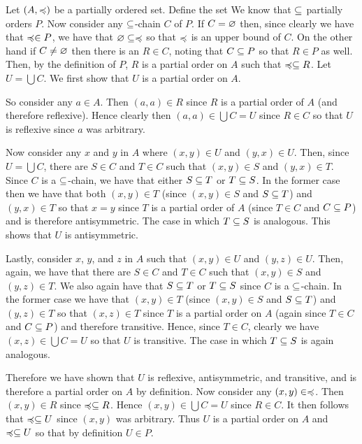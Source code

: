 {{    Let $(A, \prece)$ be a partially ordered set.
    Define the set
    We know that $\ss$ partially orders $P$.
    Now consider any $\ss$-chain $C$ of $P$.
    If $C = \es$ then, since clearly we have that $\prece \in P$, we have that $\es \ss \prece$ so that $\prece$ is an upper bound of $C$.
    On the other hand if $C \neq \es$ then there is an $R \in C$, noting that $C \ss P$ so that $R \in P$ as well.
    Then, by the definition of $P$, $R$ is a partial order on $A$ such that $\prece \ss R$.
    Let $U = \bigcup C$. We first show that $U$ is a partial order on $A$.

    So consider any $a \in A$.
    Then $(a,a) \in R$ since $R$ is a partial order of $A$ (and therefore reflexive).
    Hence clearly then $(a,a) \in \bigcup C = U$ since $R \in C$ so that $U$ is reflexive since $a$ was arbitrary.

    Now consider any $x$ and $y$ in $A$ where $(x,y) \in U$ and $(y,x) \in U$.
    Then, since $U = \bigcup C$, there are $S \in C$ and $T \in C$ such that $(x,y) \in S$ and $(y,x) \in T$.
    Since $C$ is a $\ss$-chain, we have that either $S \ss T$ or $T \ss S$.
    In the former case then we have that both $(x,y) \in T$ (since $(x,y) \in S$ and $S \ss T$) and $(y,x) \in T$ so that $x=y$ since $T$ is a partial order of $A$ (since $T \in C$ and $C \ss P$) and is therefore antisymmetric.
    The case in which $T \ss S$ is analogous.
    This shows that $U$ is antisymmetric.

    Lastly, consider $x$, $y$, and $z$ in $A$ such that $(x,y) \in U$ and $(y,z) \in U$.
    Then, again, we have that there are $S \in C$ and $T \in C$ such that $(x,y) \in S$ and $(y,z) \in T$.
    We also again have that $S \ss T$ or $T \ss S$ since $C$ is a $\ss$-chain.
    In the former case we have that $(x,y) \in T$ (since $(x,y) \in S$ and $S \ss T$) and $(y,z) \in T$ so that $(x,z) \in T$ since $T$ is a partial order on $A$ (again since $T \in C$ and $C \ss P$) and therefore transitive.
    Hence, since $T \in C$, clearly we have $(x,z) \in \bigcup C = U$ so that $U$ is transitive.
    The case in which $T \ss S$ is again analogous.

    Therefore we have shown that $U$ is reflexive, antisymmetric, and transitive, and is therefore a partial order on $A$ by definition.
    Now consider any $(x,y) \in \prece$.
    Then $(x,y) \in R$ since $\prece \ss R$.
    Hence $(x,y) \in \bigcup C = U$ since $R \in C$.
    It then follows that $\prece \ss U$ since $(x,y)$ was arbitrary.
    Thus $U$ is a partial order on $A$ and $\prece \ss U$ so that by definition $U \in P$.

}}
